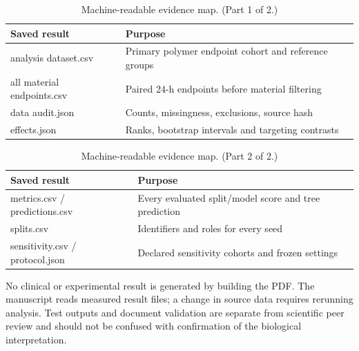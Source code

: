 \documentclass[11pt]{article}
\begin{document}
\begin{table}[H]
\centering
\small
\begin{tabularx}{\linewidth}{@{}>{\raggedright\arraybackslash}X>{\raggedright\arraybackslash}X@{}}
\toprule
\textbf{Saved result} & \textbf{Purpose} \\
\midrule
analysis dataset.csv & Primary polymer endpoint cohort and reference groups \\
all material endpoints.csv & Paired 24-h endpoints before material filtering \\
data audit.json & Counts, missingness, exclusions, source hash \\
effects.json & Ranks, bootstrap intervals and targeting contrasts \\
\bottomrule
\end{tabularx}
\caption{Machine-readable evidence map. (Part 1 of 2.)}
\label{tab:result-23}
\end{table}
\begin{table}[H]
\centering
\small
\ContinuedFloat
\begin{tabularx}{\linewidth}{@{}>{\raggedright\arraybackslash}X>{\raggedright\arraybackslash}X@{}}
\toprule
\textbf{Saved result} & \textbf{Purpose} \\
\midrule
metrics.csv /\allowbreak{} predictions.csv & Every evaluated split/\allowbreak{}model score and tree prediction \\
splits.csv & Identifiers and roles for every seed \\
sensitivity.csv /\allowbreak{} protocol.json & Declared sensitivity cohorts and frozen settings \\
\bottomrule
\end{tabularx}
\caption{Machine-readable evidence map. (Part 2 of 2.)}
\end{table}
No clinical or experimental result is generated by building the PDF. The manuscript reads measured result files; a change in source data requires rerunning analysis. Test outputs and document validation are separate from scientific peer review and should not be confused with confirmation of the biological interpretation.
\end{document}
